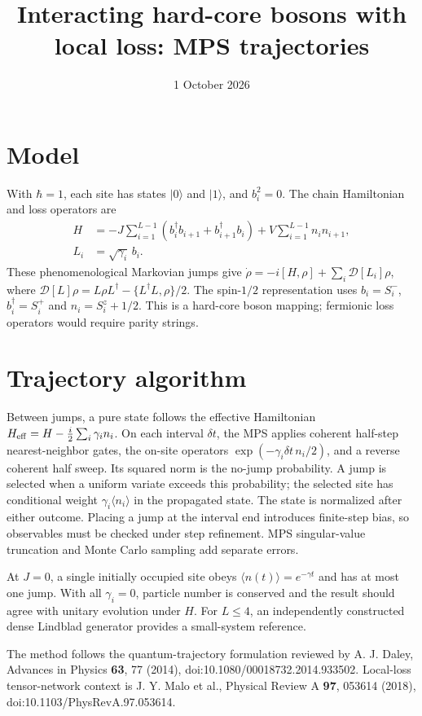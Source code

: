 \documentclass[11pt]{article}
\title{Interacting hard-core bosons with local loss: MPS trajectories}
\date{1 October 2026}
\begin{document}
\maketitle
\section*{Model}
With $\hbar=1$, each site has states $|0\rangle$ and $|1\rangle$,
and $b_i^2=0$. The chain Hamiltonian and loss operators are
\begin{align}
H&=-J\sum_{i=1}^{L-1}(b_i^\dagger b_{i+1}+b_{i+1}^\dagger b_i)
+V\sum_{i=1}^{L-1}n_i n_{i+1},\\
L_i&=\sqrt{\gamma_i}\,b_i.
\end{align}
These phenomenological Markovian jumps give
$\dot\rho=-i[H,\rho]+\sum_i\mathcal D[L_i]\rho$, where
$\mathcal D[L]\rho=L\rho L^\dagger-\{L^\dagger L,\rho\}/2$.
The spin-$1/2$ representation uses $b_i=S_i^-$,
$b_i^\dagger=S_i^+$ and $n_i=S_i^z+1/2$. This is a hard-core boson
mapping; fermionic loss operators would require parity strings.

\section*{Trajectory algorithm}
Between jumps, a pure state follows the effective Hamiltonian
$H_{\rm eff}=H-\frac{i}{2}\sum_i\gamma_i n_i$. On each interval
$\delta t$, the MPS applies coherent half-step nearest-neighbor gates,
the on-site operators $\exp(-\gamma_i\delta t\,n_i/2)$, and a reverse
coherent half sweep. Its squared norm is the no-jump probability. A jump
is selected when a uniform variate exceeds this probability; the selected
site has conditional weight $\gamma_i\langle n_i\rangle$ in the
propagated state. The state is normalized after either outcome.
Placing a jump at the interval end introduces finite-step bias, so
observables must be checked under step refinement. MPS singular-value
truncation and Monte Carlo sampling add separate errors.

At $J=0$, a single initially occupied site obeys
$\langle n(t)\rangle=e^{-\gamma t}$ and has at most one jump. With
all $\gamma_i=0$, particle number is conserved and the result should
agree with unitary evolution under $H$. For $L\le4$, an independently
constructed dense Lindblad generator provides a small-system reference.

The method follows the quantum-trajectory formulation reviewed by
A. J. Daley, Advances in Physics \textbf{63}, 77 (2014),
doi:10.1080/00018732.2014.933502. Local-loss tensor-network context is
J. Y. Malo et al., Physical Review A \textbf{97}, 053614 (2018),
doi:10.1103/PhysRevA.97.053614.
\end{document}
